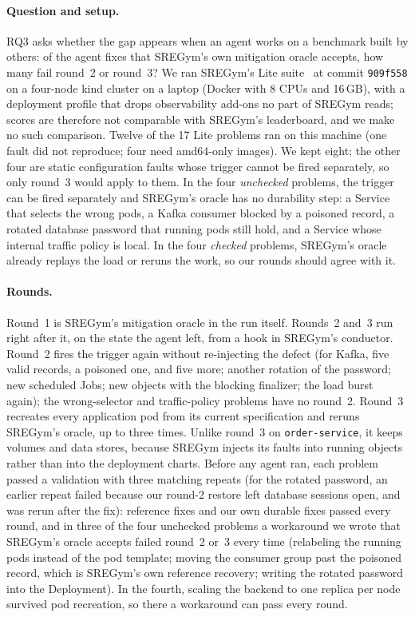 \paragraph{Question and setup.} RQ3 asks whether the gap appears when an agent works on a benchmark built by others: of
the agent fixes that SREGym's own mitigation oracle accepts, how many fail round~2 or round~3? We ran SREGym's Lite
suite~\citep{clark2026sregym} at commit \texttt{909f558} on a four-node kind cluster on a laptop (Docker with 8 CPUs and
16\,GB), with a deployment profile that drops observability add-ons no part of SREGym reads; scores are therefore not
comparable with SREGym's leaderboard, and we make no such comparison. Twelve of the 17 Lite problems ran on this machine
(one fault did not reproduce; four need amd64-only images). We kept eight; the other four are static configuration
faults whose trigger cannot be fired separately, so only round~3 would apply to them. In the four \emph{unchecked} problems, the trigger can be fired
separately and SREGym's oracle has no durability step: a Service that selects the wrong pods, a Kafka consumer blocked by
a poisoned record, a rotated database password that running pods still hold, and a Service whose internal traffic policy
is local. In the four \emph{checked} problems, SREGym's oracle already replays the load or reruns the work, so our rounds should agree with it.

\paragraph{Rounds.} Round~1 is SREGym's mitigation oracle in the run itself. Rounds~2 and~3 run right after it, on the
state the agent left, from a hook in SREGym's conductor. Round~2 fires the trigger again without re-injecting the defect
(for Kafka, five valid records, a poisoned one, and five more; another rotation of the password; new scheduled Jobs; new
objects with the blocking finalizer; the load burst again); the wrong-selector and traffic-policy problems have no
round~2. Round~3 recreates every application pod from its current specification and reruns SREGym's oracle, up to three
times. Unlike round~3 on \texttt{order-service}, it keeps volumes and data stores, because SREGym injects its faults
into running objects rather than into the deployment charts. Before any agent ran, each problem passed a validation with
three matching repeats (for the rotated password, an earlier repeat failed because our round-2 restore left database
sessions open, and was rerun after the fix): reference fixes and our own durable fixes passed every round, and in three
of the four unchecked problems a workaround we wrote that SREGym's
oracle accepts failed round~2 or~3 every time (relabeling the running pods instead of the pod template; moving the
consumer group past the poisoned record, which is SREGym's own reference recovery; writing the rotated password into the
Deployment). In the fourth, scaling the backend to one replica per node survived pod recreation, so there a workaround
can pass every round.

